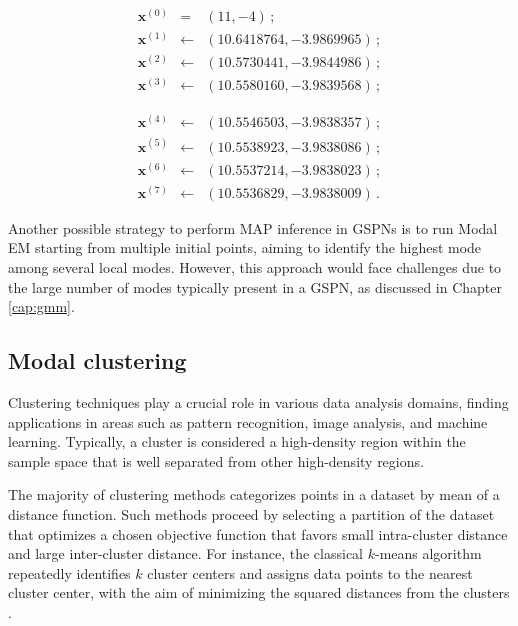 \begin{example}
  \begin{minipage}{0.45\textwidth}
    \begin{eqnarray*}
      \mathbf{x}^{(0)} & = & (11, -4) \, ; \\
      \mathbf{x}^{(1)} & \gets & (10.6418764, -3.9869965) \, ; \\
      \mathbf{x}^{(2)} & \gets & (10.5730441, -3.9844986) \, ; \\
      \mathbf{x}^{(3)} & \gets & (10.5580160,  -3.9839568) \, ;
    \end{eqnarray*}
  \end{minipage}\begin{minipage}{0.45\textwidth}
    \begin{eqnarray*}
      \mathbf{x}^{(4)} & \gets & (10.5546503, -3.9838357) \, ; \\
      \mathbf{x}^{(5)} & \gets & (10.5538923, -3.9838086) \, ; \\
      \mathbf{x}^{(6)} & \gets & (10.5537214, -3.9838023) \, ; \\
      \mathbf{x}^{(7)} & \gets & (10.5536829, -3.9838009) \, .
    \end{eqnarray*}
  \end{minipage}

  \vspace{1.5em}
\end{example}

Another possible strategy to perform MAP inference in GSPNs is to run Modal EM starting from multiple initial points, aiming to identify the highest mode among several local modes. However, this approach would face challenges due to the large number of modes typically present in a GSPN, as discussed in Chapter \ref{cap:gmm}.

\subsection{Modal clustering}

Clustering techniques play a crucial role in various data analysis domains, finding applications in areas such as pattern recognition, image analysis, and machine learning. Typically, a cluster is considered a high-density region within the sample space that is well separated from other high-density regions.

The majority of clustering methods categorizes points in a dataset by mean of a distance function. Such methods proceed by selecting a partition of the dataset that optimizes a chosen objective function that favors small intra-cluster distance and large inter-cluster distance. For instance, the classical $k$-means algorithm repeatedly identifies $k$ cluster centers and assigns data points to the nearest cluster center, with the aim of minimizing the squared distances from the clusters \citep{MacQueen1967}.

